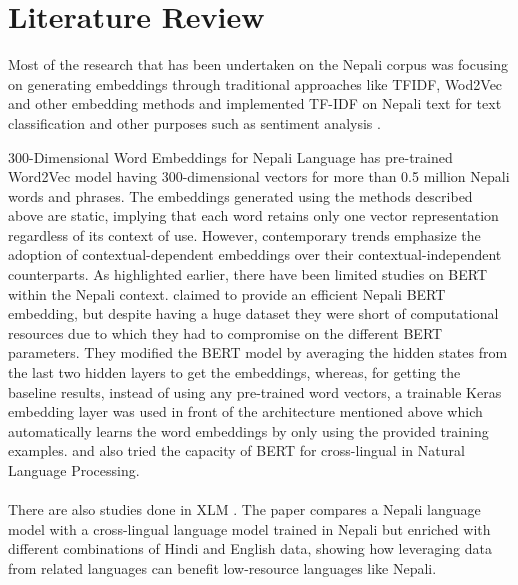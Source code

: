 \chapter{Literature Review}

Most of the research that has been undertaken on the Nepali corpus was focusing on generating embeddings through traditional approaches like TFIDF, Wod2Vec and other embedding methods and implemented TF-IDF on Nepali text for text classification and other purposes such as sentiment analysis \cite{Bhatta_Shrestha_Nepal_Pandey_Koirala_2020} \cite{Singh2019NepaliMT} \cite{shahi2018nepali} \cite{ghosh2018class}.

300-Dimensional Word Embeddings for Nepali Language \cite{300D} has pre-trained Word2Vec model having 300-dimensional vectors for more than 0.5 million Nepali words and phrases.
The embeddings generated using the methods described above are static, implying that each word retains only one vector representation regardless of its context of use. However, contemporary trends emphasize the adoption of contextual-dependent embeddings over their contextual-independent counterparts. As highlighted earlier, there have been limited studies on BERT within the Nepali context. \cite{koirala-niraula-2021-npvec1} claimed to provide an efficient Nepali BERT embedding, but despite having a huge dataset they were short of computational resources due to which they had to compromise on the different BERT parameters. They modified the BERT model by averaging the hidden states from the last two hidden layers to get the embeddings, whereas, for getting the baseline results, instead of using any pre-trained word vectors, a trainable Keras embedding layer was used in front of the architecture mentioned above which automatically learns the word embeddings by only using the provided training examples. \cite{rajan_nepalibert_2021} and  \cite{milanmg_bert-nepali_2022} also tried the capacity of BERT for cross-lingual in Natural Language Processing. \\\\
There are also studies done in XLM \cite{NEURIPS2019_c04c19c2}. The paper compares a Nepali language model with a cross-lingual language model trained in Nepali but enriched with different combinations of Hindi and English data, showing how leveraging data from related languages can benefit low-resource languages like Nepali.

